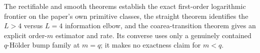 The rectifiable and smooth theorems establish the exact first-order logarithmic frontier on the paper's own primitive classes, the straight theorem identifies the \(L>4\) versus \(L=4\) information elbow, and the coarea-transition theorem gives an explicit order-\(m\) estimator and rate.  Its converse uses only a genuinely contained \(q\)-H\"older bump family at \(m=q\); it makes no exactness claim for \(m<q\).